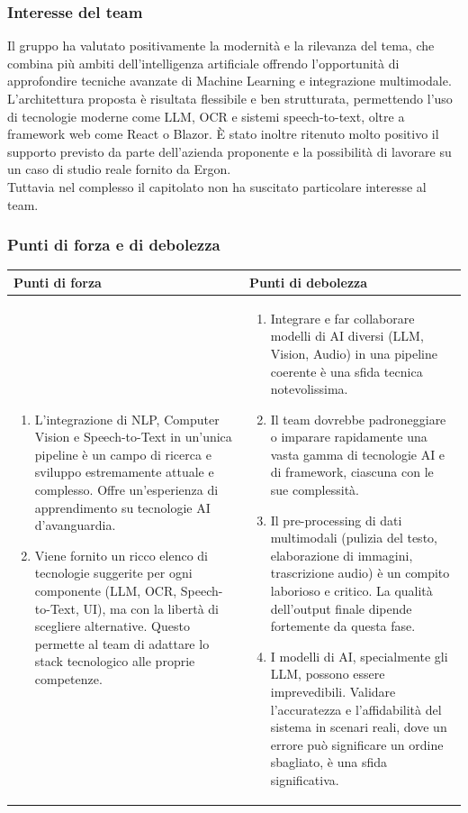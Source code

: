 \documentclass[a4paper,11pt]{article}
\begin{document}
\subsubsection{Interesse del team}
\parbox[t]{\linewidth}{%
Il gruppo ha valutato positivamente la modernità e la rilevanza del tema, che
combina più ambiti dell'intelligenza artificiale offrendo l'opportunità di
approfondire tecniche avanzate di Machine Learning e integrazione multimodale.
L'architettura proposta è risultata flessibile e ben strutturata, permettendo l'uso di
tecnologie moderne come LLM, OCR e sistemi speech-to-text, oltre a framework
web come React o Blazor. È stato inoltre ritenuto molto positivo il supporto
previsto da parte dell'azienda proponente e la possibilità di lavorare su un caso di
studio reale fornito da Ergon.\\
Tuttavia nel complesso il capitolato non ha suscitato particolare interesse al team.
}
\newpage
\subsubsection{Punti di forza e di debolezza}

{\footnotesize
\begin{tabularx}{\textwidth}{|X|X|}
\hline
\rowcolor{lightgray!40} %
\textbf{Punti di forza} & \textbf{Punti di debolezza} \\
\hline
\begin{enumerate}
\item L'integrazione di NLP, Computer Vision e Speech-to-Text in un'unica pipeline è un campo di ricerca e sviluppo estremamente attuale e complesso. Offre un'esperienza di apprendimento su tecnologie AI d'avanguardia.
\item Viene fornito un ricco elenco di tecnologie suggerite per ogni componente (LLM, OCR, Speech-to-Text, UI), ma con la libertà di scegliere alternative. Questo permette al team di adattare lo stack tecnologico alle proprie competenze.
\end{enumerate}
 & \begin{enumerate}
\item Integrare e far collaborare modelli di AI diversi (LLM, Vision, Audio) in una pipeline coerente è una sfida tecnica notevolissima.
\item Il team dovrebbe padroneggiare o imparare rapidamente una vasta gamma di tecnologie AI e di framework, ciascuna con le sue complessità.
\item Il pre-processing di dati multimodali (pulizia del testo, elaborazione di immagini, trascrizione audio) è un compito laborioso e critico. La qualità dell'output finale dipende fortemente da questa fase.
\item I modelli di AI, specialmente gli LLM, possono essere imprevedibili. Validare l'accuratezza e l'affidabilità del sistema in scenari reali, dove un errore può significare un ordine sbagliato, è una sfida significativa.
\end{enumerate} \\
\hline
\end{tabularx}
}
\end{document}
